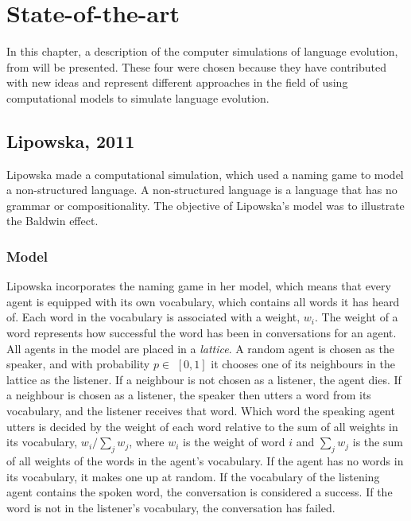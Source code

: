 \acresetall
\chapter{State-of-the-art}\label{ch:LitteratureStudy}

In this chapter, a description of the computer simulations of language evolution, from \citet{lipowska2011naming, gong2004computational, munroe2002learning, lekvam2014co} will be presented. These four were chosen because they have contributed with new ideas and represent different approaches in the field of using computational models to simulate language evolution.   

\section{Lipowska, 2011}\label{sec:Lipowska}
Lipowska made a computational simulation, which used a naming game to model a non-structured language. A non-structured language is a language that has no grammar or compositionality. The objective of Lipowska's model was to illustrate the Baldwin effect. 

\subsection{Model}
Lipowska incorporates the naming game in her model, which means that every agent is equipped with its own vocabulary, which contains all words it has heard of. Each word in the vocabulary is associated with a weight, $w_{i}$. The weight of a word represents how successful the word has been in conversations for an agent. All agents in the model are placed in a \textit{lattice}. A random agent is chosen as the speaker, and with probability $p\in$ $[0, 1]$ it chooses one of its neighbours in the lattice as the listener. If a neighbour is not chosen as a listener, the agent dies. If a neighbour is chosen as a listener, the speaker then utters a word from its vocabulary, and the listener receives that word. Which word the speaking agent utters is decided by the weight of each word relative to the sum of all weights in its vocabulary, $w_{i} / \sum_{j} w_{j}$, where $w_i$ is the weight of word $i$ and $\sum_{j} w_{j}$ is the sum of all weights of the words in the agent's vocabulary. If the agent has no words in its vocabulary, it makes one up at random. If the vocabulary of the listening agent contains the spoken word, the conversation is considered a success. If the word is not in the listener's vocabulary, the conversation has failed. 

